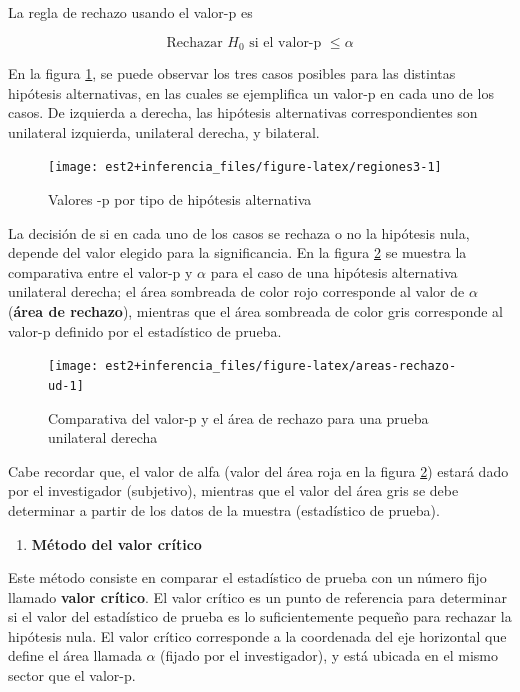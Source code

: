 \documentclass[
  11pt,
]{book}
\providecommand{\tightlist}{%
  \setlength{\itemsep}{0pt}\setlength{\parskip}{0pt}}
\theoremstyle{definition}
\theoremstyle{definition}
\theoremstyle{definition}
\theoremstyle{definition}
\theoremstyle{remark}
\begin{document}
La regla de rechazo usando el valor-p es

\[\text{Rechazar } H_0 \text{ si el valor-p } \leq \alpha\]

En la figura \ref{fig:regiones3}, se puede observar los tres casos posibles para las distintas hipótesis alternativas, en las cuales se ejemplifica un valor-p en cada uno de los casos. De izquierda a derecha, las hipótesis alternativas correspondientes son unilateral izquierda, unilateral derecha, y bilateral.

\begin{figure}

{\centering \texttt{[image: est2+inferencia\_files/figure-latex/regiones3-1]} 

}

\caption{Valores -p por tipo de hipótesis alternativa}\label{fig:regiones3}
\end{figure}

La decisión de si en cada uno de los casos se rechaza o no la hipótesis nula, depende del valor elegido para la significancia. En la figura \ref{fig:areas-rechazo-ud} se muestra la comparativa entre el valor-p y \(\alpha\) para el caso de una hipótesis alternativa unilateral derecha; el área sombreada de color rojo corresponde al valor de \(\alpha\) (\textbf{área de rechazo}), mientras que el área sombreada de color gris corresponde al valor-p definido por el estadístico de prueba.

\begin{figure}

{\centering \texttt{[image: est2+inferencia\_files/figure-latex/areas-rechazo-ud-1]} 

}

\caption{Comparativa del valor-p y el área de rechazo para una prueba unilateral derecha}\label{fig:areas-rechazo-ud}
\end{figure}

Cabe recordar que, el valor de alfa (valor del área roja en la figura \ref{fig:areas-rechazo-ud}) estará dado por el investigador (subjetivo), mientras que el valor del área gris se debe determinar a partir de los datos de la muestra (estadístico de prueba).

\begin{enumerate}
\def\labelenumi{\arabic{enumi}.}
\setcounter{enumi}{1}
\tightlist
\item
  \textbf{Método del valor crítico}
\end{enumerate}

Este método consiste en comparar el estadístico de prueba con un número fijo llamado \textbf{valor crítico}. El valor crítico es un punto de referencia para determinar si el valor del estadístico de prueba es lo suficientemente pequeño para rechazar la hipótesis nula. El valor
crítico corresponde a la coordenada del eje horizontal que define el área llamada \(\alpha\) (fijado por el investigador), y está ubicada en el mismo sector que el valor-p.~
\end{document}
